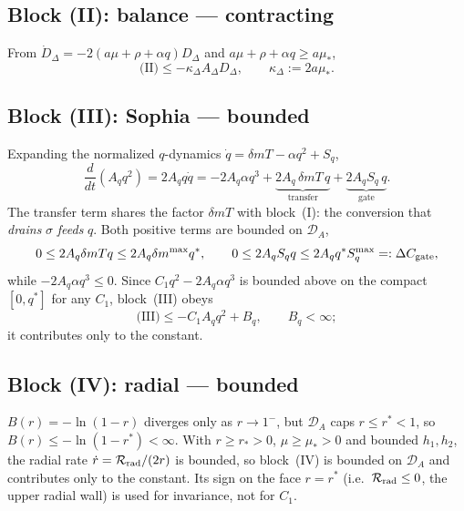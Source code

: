 \documentclass[11pt,a4paper]{article}
\newcommand{\DA}{\mathcal D_A}
\newcommand{\Sq}{S_q}
\theoremstyle{plain}
\theoremstyle{definition}
\theoremstyle{remark}
\begin{document}
\subsection{Block (II): balance --- contracting}
From $\dot D_\Delta=-2(a\mu+\rho+\alpha q)D_\Delta$ and
$a\mu+\rho+\alpha q\ge a\mu_*$,
\begin{equation}
  \boxed{\ \text{(II)}\le -\kappa_\Delta A_\Delta D_\Delta,
  \qquad
  \kappa_\Delta:=2a\mu_*.\ }
\end{equation}

\subsection{Block (III): Sophia --- bounded}
Expanding the normalized $q$-dynamics $\dot q=\delta mT-\alpha q^2+\Sq$,
\begin{equation}
  \frac{d}{dt}(A_qq^2)=2A_qq\dot q
  =-2A_q\alpha q^3
  +\underbrace{2A_q\,\delta mT\,q}_{\text{transfer}}
  +\underbrace{2A_q\Sq\,q}_{\text{gate}}.
\end{equation}
The transfer term shares the factor $\delta mT$ with block~(I): the conversion
that \emph{drains} $\sigma$ \emph{feeds} $q$. Both positive terms are bounded on
$\DA$,
\begin{equation}
  0\le 2A_q\delta mTq\le 2A_q\delta m^{\max}q^*,
  \qquad
  0\le 2A_q\Sq q\le 2A_qq^*\Sq^{\max}=:\Delta C_{\rm gate},
\end{equation}
while $-2A_q\alpha q^3\le0$. Since $C_1q^2-2A_q\alpha q^3$ is bounded above on the
compact $[0,q^*]$ for any $C_1$, block~(III) obeys
\begin{equation}
  \text{(III)}\le -C_1A_qq^2+B_q,
  \qquad
  B_q<\infty;
\end{equation}
it contributes only to the constant.

\subsection{Block (IV): radial --- bounded}
$B(r)=-\ln(1-r)$ diverges only as $r\to1^-$, but $\DA$ caps $r\le r^*<1$, so
$B(r)\le-\ln(1-r^*)<\infty$. With $r\ge r_*>0$, $\mu\ge\mu_*>0$ and bounded
$h_1,h_2$, the radial rate $\dot r=\mathcal R_{\rm rad}/(2r)$ is bounded, so
block~(IV) is bounded on $\DA$ and contributes only to the constant. Its sign on
the face $r=r^*$ (i.e.\ $\mathcal R_{\rm rad}\le0$, the upper radial wall) is used
for invariance, not for $C_1$.
\end{document}
